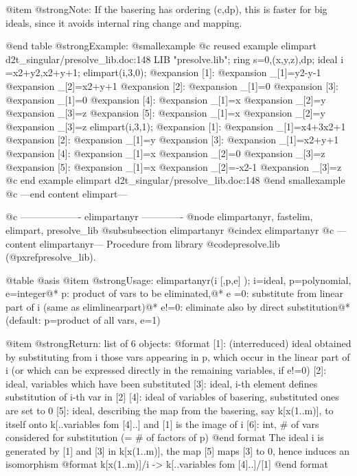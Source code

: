 @item @strong{Note:}
If the basering has ordering (c,dp), this is faster for big ideals,
since it avoids internal ring change and mapping.

@end table
@strong{Example:}
@smallexample
@c reused example elimpart d2t_singular/presolve_lib.doc:148 
LIB "presolve.lib";
ring s=0,(x,y,z),dp;
ideal i =x2+y2,x2+y+1;
elimpart(i,3,0);
@expansion{} [1]:
@expansion{}    _[1]=y2-y-1
@expansion{}    _[2]=x2+y+1
@expansion{} [2]:
@expansion{}    _[1]=0
@expansion{} [3]:
@expansion{}    _[1]=0
@expansion{} [4]:
@expansion{}    _[1]=x
@expansion{}    _[2]=y
@expansion{}    _[3]=z
@expansion{} [5]:
@expansion{}    _[1]=x
@expansion{}    _[2]=y
@expansion{}    _[3]=z
elimpart(i,3,1);
@expansion{} [1]:
@expansion{}    _[1]=x4+3x2+1
@expansion{} [2]:
@expansion{}    _[1]=y
@expansion{} [3]:
@expansion{}    _[1]=x2+y+1
@expansion{} [4]:
@expansion{}    _[1]=x
@expansion{}    _[2]=0
@expansion{}    _[3]=z
@expansion{} [5]:
@expansion{}    _[1]=x
@expansion{}    _[2]=-x2-1
@expansion{}    _[3]=z
@c end example elimpart d2t_singular/presolve_lib.doc:148
@end smallexample
@c ---end content elimpart---

@c ------------------- elimpartanyr -------------
@node elimpartanyr, fastelim, elimpart, presolve_lib
@subsubsection elimpartanyr
@cindex elimpartanyr
@c ---content elimpartanyr---
Procedure from library @code{presolve.lib} (@pxref{presolve_lib}).

@table @asis
@item @strong{Usage:}
elimpartanyr(i [,p,e] ); i=ideal, p=polynomial, e=integer@*
p: product of vars to be eliminated,@*
e =0: substitute from linear part of i (same as elimlinearpart)@*
e!=0: eliminate also by direct substitution@*
(default: p=product of all vars, e=1)

@item @strong{Return:}
list of 6 objects:
  @format
  [1]: (interreduced) ideal obtained by substituting from i those vars
       appearing in p, which occur in the linear part of i (or which can
       be expressed directly in the remaining variables, if e!=0)
  [2]: ideal, variables which have been substituted
  [3]: ideal, i-th element defines substitution of i-th var in [2]
  [4]: ideal of variables of basering, substituted ones are set to 0
  [5]: ideal, describing the map from the basering, say k[x(1..m)], to
       itself onto k[..variables fom [4]..] and [1] is the image of i
  [6]: int, # of vars considered for substitution (= # of factors of p)
  @end format
The ideal i is generated by [1] and [3] in k[x(1..m)], the map [5]
maps [3] to 0, hence induces an isomorphism
  @format
            k[x(1..m)]/i -> k[..variables fom [4]..]/[1]
  @end format


